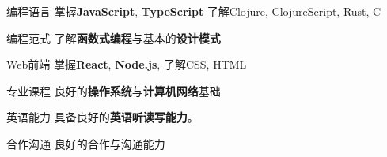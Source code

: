 

\begin{cvskills}

\cvskill
  {编程语言} %
  {掌握\textbf{JavaScript}, \textbf{TypeScript} \hspace{1mm} 了解Clojure, ClojureScript, Rust, C} %

\cvskill
{编程范式} %
{了解\textbf{函数式编程}与基本的\textbf{设计模式}} %

\cvskill
  {Web前端} %
  {掌握\textbf{React}, \textbf{Node.js}, 了解CSS, HTML} %

\cvskill
  {专业课程} %
  {良好的\textbf{操作系统}与\textbf{计算机网络}基础} %

\cvskill
  {英语能力} %
  {具备良好的\textbf{英语听读写能力}。} %

\cvskill
  {合作沟通} %
  {良好的合作与沟通能力} %

\end{cvskills}
